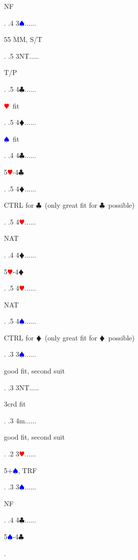 \documentclass[a4paper]{article}
\newcommand{\BC}{\textcolor{OliveGreen}{$\clubsuit$}}
\newcommand{\BD}{\textcolor{RedOrange}{$\vardiamondsuit$}}
\newcommand{\BH}{\textcolor{Red}{$\varheartsuit${}}}
\newcommand{\BS}{\textcolor{Blue}{$\spadesuit${}}}
\begin{document}
{\begin{minipage}[t]{0.8\textwidth}
NF
\end{minipage}. 
 .4 3\BS......\begin{minipage}[t]{0.8\textwidth}
55 MM, S/T
\end{minipage}. 
 .5 3NT.....\begin{minipage}[t]{0.8\textwidth}
T/P
\end{minipage}. 
 .5 4\BC......\begin{minipage}[t]{0.8\textwidth}
\BH\ fit
\end{minipage}. 
 .5 4\BD......\begin{minipage}[t]{0.8\textwidth}
\BS\ fit
\end{minipage}. 
 .4 4\BC......\begin{minipage}[t]{0.8\textwidth}
5\BH -4\BC 
\end{minipage}. 
 .5 4\BD......\begin{minipage}[t]{0.8\textwidth}
CTRL for \BC\ (only great fit for \BC\ possible)
\end{minipage}. 
 .5 4\BH......\begin{minipage}[t]{0.8\textwidth}
NAT
\end{minipage}. 
 .4 4\BD......\begin{minipage}[t]{0.8\textwidth}
5\BH -4\BD 
\end{minipage}. 
 .5 4\BH......\begin{minipage}[t]{0.8\textwidth}
NAT
\end{minipage}. 
 .5 4\BS......\begin{minipage}[t]{0.8\textwidth}
CTRL for \BD\ (only great fit for \BD\ possible)
\end{minipage}. 
 .3 3\BS......\begin{minipage}[t]{0.8\textwidth}
good fit, second suit
\end{minipage}. 
 .3 3NT.....\begin{minipage}[t]{0.8\textwidth}
3crd fit
\end{minipage}. 
 .3 4m......\begin{minipage}[t]{0.8\textwidth}
good fit, second suit
\end{minipage}. 
 .2 3\BH......\begin{minipage}[t]{0.8\textwidth}
5+\BS , TRF
\end{minipage}. 
 .3 3\BS......\begin{minipage}[t]{0.8\textwidth}
NF
\end{minipage}. 
 .4 4\BC......\begin{minipage}[t]{0.8\textwidth}
5\BS -4\BC 
\end{minipage}. 
}
\end{document}
